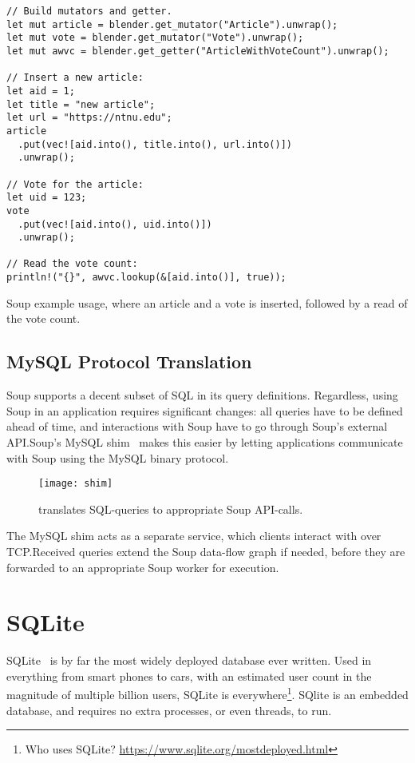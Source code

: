 \begin{listing}[H]
  \begin{verbatim}
// Build mutators and getter.
let mut article = blender.get_mutator("Article").unwrap();
let mut vote = blender.get_mutator("Vote").unwrap();
let mut awvc = blender.get_getter("ArticleWithVoteCount").unwrap();

// Insert a new article:
let aid = 1;
let title = "new article";
let url = "https://ntnu.edu";
article
  .put(vec![aid.into(), title.into(), url.into()])
  .unwrap();

// Vote for the article:
let uid = 123;
vote
  .put(vec![aid.into(), uid.into()])
  .unwrap();

// Read the vote count:
println!("{}", awvc.lookup(&[aid.into()], true));
  \end{verbatim}

  \caption{Soup example usage, where an article and a vote is inserted,
  followed by a read of the vote count.}\label{lst:soup-api}
\end{listing}

\subsection{MySQL Protocol Translation}\label{sec:mysql-shim}

Soup supports a decent subset of SQL in its query definitions. Regardless, using
Soup in an application requires significant changes: all queries have to be
defined ahead of time, and interactions with Soup have to go through Soup's
external API.\@ Soup's MySQL shim~\cite{soup-mysql} makes this easier by letting
applications communicate with Soup using the MySQL binary protocol.

\begin{figure}[H]
  \centering
  \texttt{[image: shim]}
  \caption{ translates SQL-queries to appropriate Soup
  API-calls.}
\end{figure}

The MySQL shim acts as a separate service, which clients interact with over
TCP.\@ Received queries extend the Soup data-flow graph if needed, before they
are forwarded to an appropriate Soup worker for execution.

\section{SQLite}\label{sec:sqlite}
SQLite~\cite{sqlite} is by far the most widely deployed database ever written.
Used in everything from smart phones to cars, with an estimated user count in
the magnitude of multiple billion users, SQLite is everywhere\footnote{Who
uses SQLite? \url{https://www.sqlite.org/mostdeployed.html}}. SQlite is an
embedded database, and requires no extra processes, or even threads, to run.

